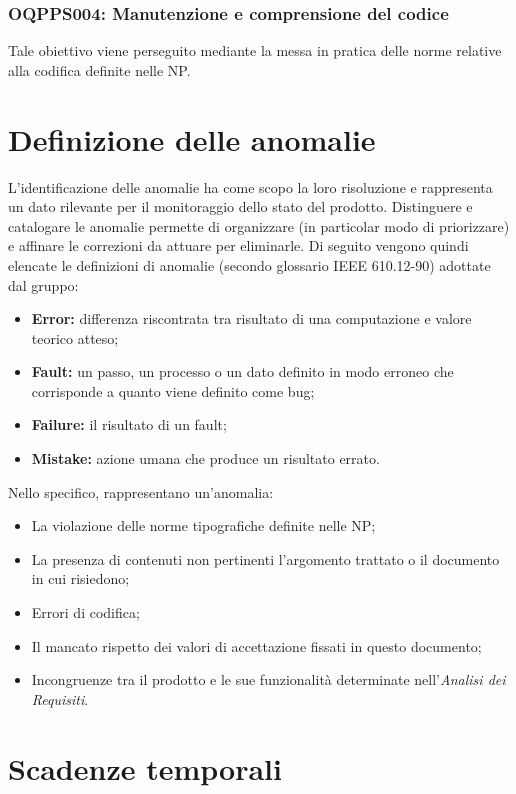 \documentclass[openany,12pt,a4paper]{report}
\begin{document}
	\subsubsection{OQPPS004: Manutenzione e comprensione del codice}
	Tale obiettivo viene perseguito mediante la messa in pratica delle norme relative alla codifica definite nelle NP.
	
	\section{Definizione delle anomalie}
	
	L’identificazione delle anomalie ha come scopo la loro risoluzione e rappresenta un dato rilevante per il monitoraggio dello stato del prodotto. Distinguere e catalogare le anomalie permette di organizzare (in particolar modo di priorizzare) e affinare le correzioni da attuare per eliminarle. Di seguito
	vengono quindi elencate le definizioni di anomalie (secondo glossario IEEE 610.12-90) adottate dal gruppo:
	
	\begin{itemize}
		\item \textbf{Error:} differenza riscontrata tra risultato di una computazione e valore teorico atteso;
		\item \textbf{Fault:} un passo, un processo o un dato definito in modo erroneo che corrisponde a quanto viene definito come bug;
		\item \textbf{Failure:} il risultato di un fault;
		\item \textbf{Mistake:} azione umana che produce un risultato errato.
	\end{itemize}

	Nello specifico, rappresentano un'anomalia:
	
	\begin{itemize}
		\item La violazione delle norme tipografiche definite nelle NP;
		\item La presenza di contenuti non pertinenti l'argomento trattato o il documento in cui risiedono;
		\item Errori di codifica;
		\item Il mancato rispetto dei valori di accettazione fissati in questo documento;
		\item Incongruenze tra il prodotto e le sue funzionalità determinate nell'\textit{Analisi dei Requisiti}.
	\end{itemize}
    
	\section{Scadenze temporali}
	
\end{document}
